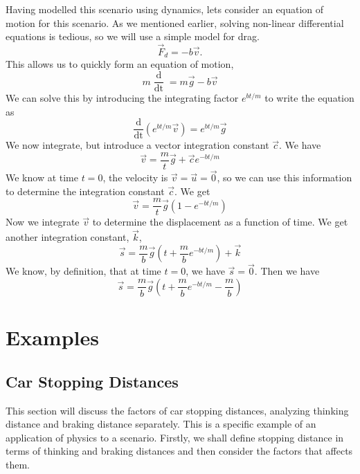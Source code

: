 Having modelled this scenario using dynamics, lets consider an equation of motion for this scenario. As we mentioned earlier, solving non-linear differential equations is tedious, so we will use a simple model for drag.
\begin{equation*}
    \vec{F}_d = -b\vec{v}.
\end{equation*}
This allows us to quickly form an equation of motion,
\begin{equation*}
    m \frac{\mathop{\mathrm{d}\vec{v}}}{\mathop{\mathrm{d}t}} = m \vec{g} - b \vec{v}
\end{equation*}
We can solve this by introducing the integrating factor $e^{bt / m}$ to write the equation as
\begin{equation*}
    \frac{\mathrm{d}}{\mathop{\mathrm{d}t}} (e^{bt/m} \vec{v}) = e^{bt/m} \vec{g}
\end{equation*}
We now integrate, but introduce a vector integration constant $\vec{c}$. We have
\begin{equation*}
    \vec{v} = \frac{m}{t}\vec{g} + \vec{c} e^{-bt/m}
\end{equation*}
We know at time $t = 0$, the velocity is $\vec{v} = \vec{u} = \vec{0}$, so we can use this information to determine the integration constant $\vec{c}$. We get
\begin{equation*}
    \vec{v} = \frac{m}{t}\vec{g}(1 - e^{-bt/m})
\end{equation*}
Now we integrate $\vec{v}$ to determine the displacement as a function of time.  We get another integration constant, $\vec{k}$,
\begin{equation*}
    \vec{s} = \frac{m}{b}\vec{g} \left(t + \frac{m}{b} e^{-bt/m}\right) + \vec{k} 
\end{equation*}
We know, by definition, that at time $t = 0$, we have $\vec{s} = \vec{0}$. Then we have
\begin{equation*}
    \vec{s} = \frac{m}{b}\vec{g} \left(t + \frac{m}{b} e^{-bt/m} - \frac{m}{b}\right) 
\end{equation*}

\section{Examples}

\subsection{Car Stopping Distances}

This section will discuss the factors of car stopping distances, analyzing thinking distance and braking distance separately. This is a specific example of an application of physics to a scenario. Firstly, we shall define stopping distance in terms of thinking and braking distances and then consider the factors that affects them. 

